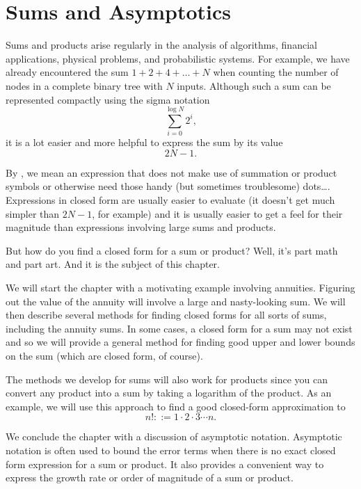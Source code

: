 \chapter{Sums and Asymptotics}\label{asymptotics_chap}

Sums and products arise regularly in the analysis of algorithms,
financial applications, physical problems, and probabilistic systems.
For example, we have already encountered the sum $1 + 2 + 4 + \dots +
N$ when counting the number of nodes in a complete binary tree with
$N$ inputs.  Although such a sum can be represented compactly using
the sigma notation
\begin{equation}
    \sum_{i = 0}^{\log N} 2^i,
\end{equation}
it is a lot easier and more helpful to express the sum by
its  value
\begin{equation*}
    2 N - 1.
\end{equation*}

By , we mean an expression that does not make use of
summation or product symbols or otherwise need those handy (but
sometimes troublesome) dots\dots.  Expressions in closed form are
usually easier to evaluate (it doesn't get much simpler than $2 N -
1$, for example) and it is usually easier to get a feel for their
magnitude than expressions involving large sums and products.

But how do you find a closed form for a sum or product?  Well, it's
part math and part art.  And it is the subject of this chapter.

We will start the chapter with a motivating example involving
annuities.  Figuring out the value of the annuity will involve a
large and nasty-looking sum.  We will then describe several methods
for finding closed forms for all sorts of sums, including the annuity
sums.  In some cases, a closed form for a sum may not exist and so we
will provide a general method for finding good upper and lower bounds
on the sum (which are closed form, of course).

The methods we develop for sums will also work for products since you
can convert any product into a sum by taking a logarithm of the
product.  As an example, we will use this approach to find a good
closed-form approximation to
\begin{equation*}
    n! ::= 1 \cdot 2 \cdot 3 \cdots n.
\end{equation*}

We conclude the chapter with a discussion of asymptotic notation.
Asymptotic notation is often used to bound the error terms when there
is no exact closed form expression for a sum or product.  It also
provides a convenient way to express the growth rate or order of
magnitude of a sum or product.


